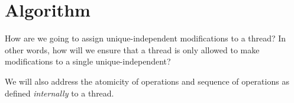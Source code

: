 \section{Algorithm}

How are we going to assign unique-independent modifications to a thread? In other words, how will we ensure that a thread is only allowed to make modifications to a single unique-independent?

We will also address the atomicity of operations and sequence of operations as defined \textit{internally} to a thread.
